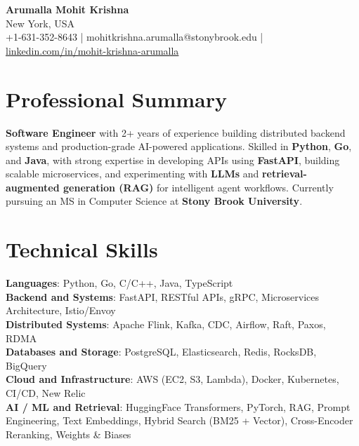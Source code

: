 \documentclass[letterpaper,11pt]{article}
\begin{document}
\begin{center}
  {\Large \textbf{Arumalla Mohit Krishna}} \\
  New York, USA \\
  +1-631-352-8643 \enspace | \enspace mohitkrishna.arumalla@stonybrook.edu \enspace | \enspace \href{https://www.linkedin.com/in/mohit-krishna-arumalla}{linkedin.com/in/mohit-krishna-arumalla}
\end{center}

\section{Professional Summary}
  \begin{itemize}[leftmargin=0.15in, label={}]
    \small{\item{
     \textbf{Software Engineer} with 2+ years of experience building distributed backend systems and production-grade AI-powered applications. Skilled in \textbf{Python}, \textbf{Go}, and \textbf{Java}, with strong expertise in developing APIs using \textbf{FastAPI}, building scalable microservices, and experimenting with \textbf{LLMs} and \textbf{retrieval-augmented generation (RAG)} for intelligent agent workflows. Currently pursuing an MS in Computer Science at \textbf{Stony Brook University}.
    }}
  \end{itemize}
\vspace{-16pt}

\section{Technical Skills}
 \begin{itemize}[leftmargin=0.15in, label={}]
    \small{\item{
     \textbf{Languages}: Python, Go, C/C++, Java, TypeScript \\
     \textbf{Backend and Systems}: FastAPI, RESTful APIs, gRPC, Microservices Architecture, Istio/Envoy \\
     \textbf{Distributed Systems}: Apache Flink, Kafka, CDC, Airflow, Raft, Paxos, RDMA \\
     \textbf{Databases and Storage}: PostgreSQL, Elasticsearch, Redis, RocksDB, BigQuery \\
     \textbf{Cloud and Infrastructure}: AWS (EC2, S3, Lambda), Docker, Kubernetes, CI/CD, New Relic \\
     \textbf{AI / ML and Retrieval}: HuggingFace Transformers, PyTorch, RAG, Prompt Engineering, Text Embeddings, Hybrid Search (BM25 + Vector), Cross-Encoder Reranking, Weights \& Biases
    }}
 \end{itemize}
\vspace{-16pt}
\end{document}
